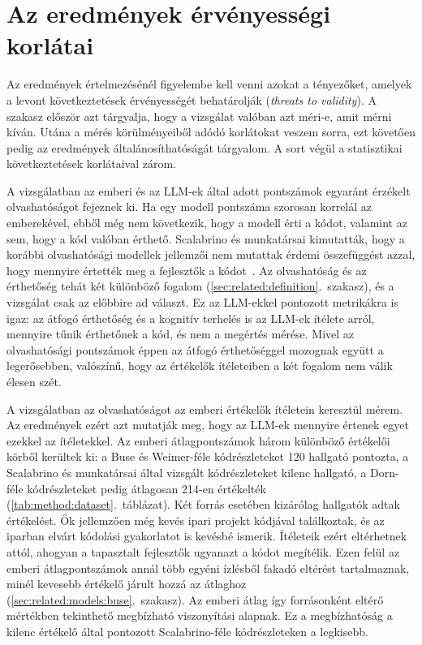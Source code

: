 \documentclass[
]{elteikthesis}[2024/04/26]
\begin{document}
\section{Az eredmények érvényességi korlátai}
\label{sec:discussion:validity}

Az eredmények értelmezésénél figyelembe kell venni azokat a tényezőket,
amelyek a levont következtetések érvényességét behatárolják (\textit{threats to validity}).
A szakasz először azt tárgyalja, hogy a vizsgálat valóban azt méri-e, amit mérni kíván.
Utána a mérés körülményeiből adódó korlátokat veszem sorra,
ezt követően pedig az eredmények általánosíthatóságát tárgyalom.
A sort végül a statisztikai következtetések korlátaival zárom.

A vizsgálatban az emberi és az LLM-ek által adott pontszámok
egyaránt érzékelt olvashatóságot fejeznek ki.
Ha egy modell pontszáma szorosan korrelál az emberekével,
ebből még nem következik, hogy a modell érti a kódot, valamint az sem, hogy a kód valóban érthető.
Scalabrino és munkatársai kimutatták, hogy a korábbi olvashatósági modellek jellemzői
nem mutattak érdemi összefüggést azzal, hogy mennyire értették meg a fejlesztők a kódot~\cite{scalabrino2017understandability}.
Az olvashatóság és az érthetőség tehát két különböző fogalom (\ref{sec:related:definition}.~szakasz),
és a vizsgálat csak az előbbire ad választ.
Ez az LLM-ekkel pontozott metrikákra is igaz: az átfogó érthetőség és a kognitív terhelés is az
LLM-ek ítélete arról, mennyire tűnik érthetőnek a kód, és nem a megértés mérése.
Mivel az olvashatósági pontszámok éppen az átfogó érthetőséggel mozognak együtt a legerősebben,
valószínű, hogy az értékelők ítéleteiben a két fogalom nem válik élesen szét.

A vizsgálatban az olvashatóságot az emberi értékelők ítéletein keresztül mérem.
Az eredmények ezért azt mutatják meg, hogy az LLM-ek mennyire értenek egyet ezekkel az ítéletekkel.
Az emberi átlagpontszámok három különböző értékelői körből kerültek ki:
a Buse és Weimer-féle kódrészleteket 120 hallgató pontozta,
a Scalabrino és munkatársai által vizsgált kódrészleteket kilenc hallgató,
a Dorn-féle kódrészleteket pedig átlagosan 214-en értékelték (\ref{tab:method:dataset}.~táblázat).
Két forrás esetében kizárólag hallgatók adtak értékelést.
Ők jellemzően még kevés ipari projekt kódjával találkoztak,
és az iparban elvárt kódolási gyakorlatot is kevésbé ismerik.
Ítéleteik ezért eltérhetnek attól, ahogyan a tapasztalt fejlesztők ugyanazt a kódot megítélik.
Ezen felül az emberi átlagpontszámok annál több egyéni ízlésből fakadó eltérést tartalmaznak,
minél kevesebb értékelő járult hozzá az átlaghoz (\ref{sec:related:models:buse}.~szakasz).
Az emberi átlag így forrásonként eltérő mértékben tekinthető megbízható viszonyítási alapnak.
Ez a megbízhatóság a kilenc értékelő által pontozott Scalabrino-féle kódrészleteken a legkisebb.
\end{document}
